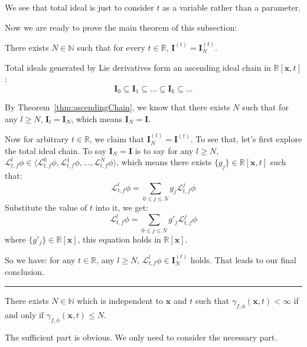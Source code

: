 \documentclass{jssc}
\newcommand{\rulex}{\hfill\rule{1mm}{3mm}}
\begin{document}
We see that total ideal is just to consider $t$ as a variable rather than a parameter.

Now we are ready to prove the main theorem of this subsection: 
\begin{theorem}
\label{thm:lieIdeal}
There exists $N \in \mathbb{N}$ such that for every $t \in \mathbb{R}$, $\boldsymbol{I}^{(t)} = \boldsymbol{I}_N^{(t)}$.
\end{theorem}

\proof
Total ideals generated by Lie derivatives form an ascending ideal chain in $\mathbb{R}[\boldsymbol{x}, t]$:
\begin{equation*}
	\boldsymbol{I}_0 \subseteq \boldsymbol{I}_1 \subseteq \dots \subseteq \boldsymbol{I}_{k} \subseteq \dots
\end{equation*}

By Theorem~\ref{thm:ascendingChain}, we know that there exists $N$ such that for any $l \geq N$, $\boldsymbol{I}_l = \boldsymbol{I}_N$, which means $\boldsymbol{I}_N = \boldsymbol{I}$.

Now for arbitrary $t \in \mathbb{R}$, we claim that $\boldsymbol{I}_N^{(t)} = \boldsymbol{I}^{(t)}$. To see that, let's first explore the total ideal chain. To say $\boldsymbol{I}_N = \boldsymbol{I}$ is to say for any $l \geq N$, $\mathcal{L}_{t, f}^l \phi  \in \langle \mathcal{L}_{t, f}^0 \phi, \mathcal{L}_{t, f}^1 \phi, \dots, \mathcal{L}_{t, f}^N \phi \rangle$, which means there exists $\{ g_j \} \in \mathbb{R} [\boldsymbol{x}, t]$ such that:
	\begin{equation*}
		\mathcal{L}_{t, f}^l \phi = \sum_{0 \leq j \leq N} g_j \mathcal{L}_{t, f}^j \phi
	\end{equation*}
Substitute the value of $t$ into it, we get:
	\begin{equation*}
		\mathcal{L}_{t, f}^l \phi = \sum_{0 \leq j \leq N} g'_j \mathcal{L}_{t, f}^j \phi
	\end{equation*}
where $\{ g'_j \} \in \mathbb{R} [\boldsymbol{x}]$, this equation holds in $\mathbb{R} [\boldsymbol{x}]$. 

So we have: for any $t \in \mathbb{R}$, any $l \geq N$, $\mathcal{L}_{t, f}^l \phi  \in \boldsymbol{I}_N^{(t)}$ holds. That leads to our final conclusion.
\rulex

\begin{corollary}
\label{cor:lieRank}
There exists $N \in \mathbb{N}$ which is independent to $\boldsymbol{x}$ and $t$ such that $\gamma_{f, \phi}(\boldsymbol{x}, t) < \infty$ if and only if $\gamma_{f, \phi}(\boldsymbol{x}, t) \leq N$.
\end{corollary}
\proof
The sufficient part is obvious. We only need to consider the necessary part.
\end{document}
